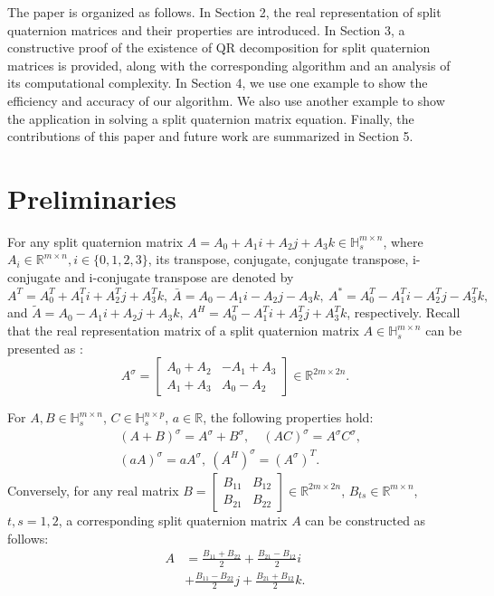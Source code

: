 \documentclass[conference]{IEEEtran}
\numberwithin{equation}{section}
\begin{document}
The paper is organized as follows. In Section 2, the real representation of split quaternion matrices and their properties are introduced. In Section 3, a constructive proof of the existence of QR decomposition for split quaternion matrices is provided, along with the corresponding algorithm and an analysis of its computational complexity. In Section 4, we use one example to show the efficiency and accuracy of our algorithm. We also use another example to show the application in solving a split quaternion matrix equation. Finally, the contributions of this paper and future work are summarized in Section 5.


\section{Preliminaries}
For any split quaternion matrix ${A}=A_{0}+A_{1}i + A_{2}j + A_{3}k \in\mathbb{H}_{s}^{m\times n}$, where $A_{i}\in\mathbb{R}^{m\times n}, i\in\{0,1,2,3\}$, its transpose, conjugate, conjugate transpose, i-conjugate and i-conjugate transpose are  denoted by 
 ${A}^T = A_0^T + A_1^Ti + A_2^Tj + A_3^Tk, \ \bar{{A}} = A_0 - A_1i - A_2j - A_3k, \ {A}^* = A_0^T - A_1^Ti - A_2^Tj - A_3^Tk,$ and
 $\tilde{A} = A_0 - A_1i + A_2j + A_3k, \ {A}^H = A_0^T - A_1^Ti + A_2^Tj + A_3^Tk$, respectively. Recall that the real representation matrix of a split quaternion matrix $A \in\mathbb{H}_{s}^{m\times n}$ can be presented as \cite{TJiang2018, Gang2024}:
\begin{equation}\label{eq:2.1}
A^\sigma = \begin{bmatrix} A_0 + A_2 & -A_1 + A_3 \\ A_1 + A_3 & A_0 - A_2 \end{bmatrix} \in \mathbb{R}^{2m \times 2n}.
\end{equation}

For $A, B \in \mathbb{H}_s^{m \times n}$, $C \in \mathbb{H}_s^{n \times p}$, $a \in \mathbb{R}$, the following properties hold:
\begin{equation}\label{eq:2.2}
\begin{aligned}
    &(A + B)^\sigma = A^\sigma + B^\sigma, \quad (AC)^\sigma = A^\sigma C^\sigma, \\
    &(a A)^\sigma = a A^\sigma, \ (A^H)^\sigma = (A^\sigma)^T.
\end{aligned}
\end{equation}
Conversely, for any real matrix $B = \begin{bmatrix} B_{11} & B_{12} \\ B_{21} & B_{22} \end{bmatrix} \in \mathbb{R}^{2m \times 2n}$, $B_{ts} \in \mathbb{R}^{m \times n}$, $t, s = 1, 2$, a corresponding split quaternion matrix $A$ can be constructed as follows:
\begin{equation}\label{eq:2.3}
\begin{aligned}
{A} &= \frac{B_{11} + B_{22}}{2} + \frac{B_{21} - B_{12}}{2}i \\
    &+ \frac{B_{11} - B_{22}}{2}j + \frac{B_{21} + B_{12}}{2}k.
\end{aligned}
\end{equation}
\end{document}
